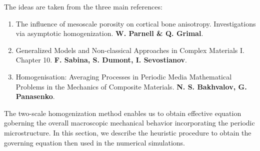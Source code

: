 The ideas are taken from the three main references:
\begin{enumerate}
    \item The influence of mesoscale porosity on cortical bone anisotropy. Investigations via asymptotic homogenization. \textbf{W. Parnell \& Q. Grimal}.
    \item Generalized Models and Non-classical Approaches in Complex Materials I. Chapter 10. \textbf{F. Sabina, S. Dumont, I. Sevostianov}.
    \item Homogenisation: Averaging Processes in Periodic Media Mathematical Problems in the Mechanics of Composite Materials. \textbf{N. S. Bakhvalov, G. Panasenko}.
\end{enumerate}

The two-scale homogenization method enables us to obtain effective equation goberning the overall macroscopic mechanical behavior incorporating the periodic microstructure. In this section, we describe the heuristic procedure to obtain the governing equation then used in the numerical simulations.

